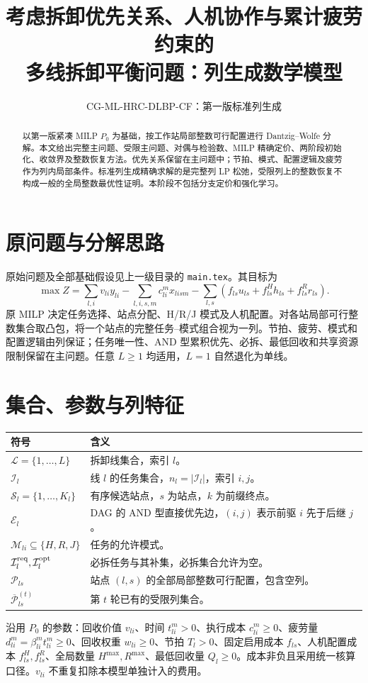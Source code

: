 \documentclass[UTF8,a4paper,11pt]{ctexart}
\title{考虑拆卸优先关系、人机协作与累计疲劳约束的\\多线拆卸平衡问题：列生成数学模型}
\author{CG-ML-HRC-DLBP-CF：第一版标准列生成}
\date{}
\newcommand{\cg}[1]{\tag{CG-#1}}
\begin{document}
\maketitle
\begin{abstract}
以第一版紧凑 MILP $P_0$ 为基础，按工作站局部整数可行配置进行 Dantzig--Wolfe 分解。本文给出完整主问题、受限主问题、对偶与检验数、MILP 精确定价、两阶段初始化、收敛界及整数恢复方法。优先关系保留在主问题中；节拍、模式、配置逻辑及疲劳作为列内局部条件。标准列生成精确求解的是完整列 LP 松弛，受限列上的整数恢复不构成一般的全局整数最优性证明。本阶段不包括分支定价和强化学习。
\end{abstract}

\section{原问题与分解思路}
原始问题及全部基础假设见上一级目录的 \texttt{main.tex}。其目标为
\begin{equation}
\max Z=\sum_{l,i}v_{li}y_{li}-\sum_{l,i,s,m}c_{li}^mx_{lism}
-\sum_{l,s}(f_{ls}u_{ls}+f_{ls}^Hh_{ls}+f_{ls}^Rr_{ls}).\cg{1}
\end{equation}
原 MILP 决定任务选择、站点分配、H/R/J 模式及人机配置。对各站局部可行整数集合取凸包，将一个站点的完整任务--模式组合视为一列。节拍、疲劳、模式和配置逻辑由列保证；任务唯一性、AND 型累积优先、必拆、最低回收和共享资源限制保留在主问题。任意 $L\geq1$ 均适用，$L=1$ 自然退化为单线。

\section{集合、参数与列特征}
\begin{longtable}{p{}p{}}
\toprule 符号 & 含义\\\midrule
$\mathcal L=\{1,\ldots,L\}$ & 拆卸线集合，索引 $l$。\\
$\mathcal I_l$ & 线 $l$ 的任务集合，$n_l=|\mathcal I_l|$，索引 $i,j$。\\
$\mathcal S_l=\{1,\ldots,K_l\}$ & 有序候选站点，$s$ 为站点，$k$ 为前缀终点。\\
$\mathcal E_l$ & DAG 的 AND 型直接优先边，$(i,j)$ 表示前驱 $i$ 先于后继 $j$。\\
$\mathcal M_{li}\subseteq\{H,R,J\}$ & 任务的允许模式。\\
$\mathcal I_l^{\rm req},\mathcal I_l^{\rm opt}$ & 必拆任务与其补集，必拆集合允许为空。\\
$\mathcal P_{ls}$ & 站点 $(l,s)$ 的全部局部整数可行配置，包含空列。\\
$\overline{\mathcal P}_{ls}^{(t)}$ & 第 $t$ 轮已有的受限列集合。\\\bottomrule
\end{longtable}
沿用 $P_0$ 的参数：回收价值 $v_{li}$、时间 $t_{li}^m>0$、执行成本 $c_{li}^m\geq0$、疲劳量 $d_{li}^m=\beta_{li}^mt_{li}^m\geq0$、回收权重 $w_{li}\geq0$、节拍 $T_l>0$、固定启用成本 $f_{ls}$、人机配置成本 $f_{ls}^H,f_{ls}^R$、全局数量 $H^{\max},R^{\max}$、最低回收量 $Q_l\geq0$。成本非负且采用统一核算口径。$v_{li}$ 不重复扣除本模型单独计入的费用。
\end{document}
